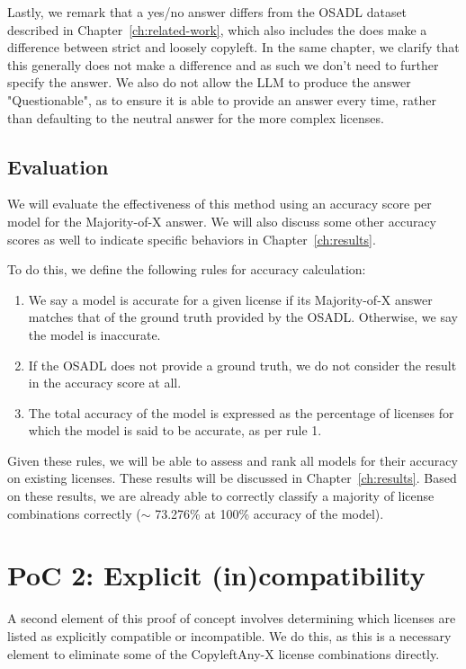 Lastly, we remark that a yes/no answer differs from the OSADL dataset described in Chapter~\ref{ch:related-work}, which also includes the does make a difference between strict and loosely copyleft. In the same chapter, we clarify that this generally does not make a difference and as such we don't need to further specify the answer. We also do not allow the LLM to produce the answer "Questionable", as to ensure it is able to provide an answer every time, rather than defaulting to the neutral answer for the more complex licenses.

\subsection{Evaluation}

We will evaluate the effectiveness of this method using an accuracy score per model for the Majority-of-X answer. We will also discuss some other accuracy scores as well to indicate specific behaviors in Chapter~\ref{ch:results}.

To do this, we define the following rules for accuracy calculation:

\begin{enumerate}
	\item We say a model is accurate for a given license if its Majority-of-X answer matches that of the ground truth provided by the OSADL. Otherwise, we say the model is inaccurate.
	\item If the OSADL does not provide a ground truth, we do not consider the result in the accuracy score at all.
	\item The total accuracy of the model is expressed as the percentage of licenses for which the model is said to be accurate, as per rule 1.
\end{enumerate}

Given these rules, we will be able to assess and rank all models for their accuracy on existing licenses. These results will be discussed in Chapter~\ref{ch:results}. Based on these results, we are already able to correctly classify a majority of license combinations correctly ($\sim$ 73.276\% at 100\% accuracy of the model). \\

\section{PoC 2: Explicit (in)compatibility}

A second element of this proof of concept involves determining which licenses are listed as explicitly compatible or incompatible. We do this, as this is a necessary element to eliminate some of the CopyleftAny-X license combinations directly.

